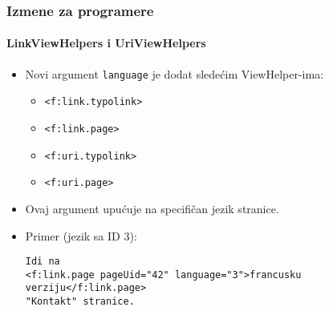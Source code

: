 
\begin{frame}[fragile]
	\frametitle{Izmene za programere}
	\framesubtitle{LinkViewHelpers i UriViewHelpers}

	\lstset{basicstyle=\tiny\ttfamily}

	\begin{itemize}
		\item Novi argument \texttt{language} je dodat sledećim ViewHelper-ima:
			\begin{itemize}
				\item \texttt{<f:link.typolink>}
				\item \texttt{<f:link.page>}
				\item \texttt{<f:uri.typolink>}
				\item \texttt{<f:uri.page>}
			\end{itemize}

		\item Ovaj argument upućuje na specifičan jezik stranice.
		\item Primer (jezik sa ID 3):
\begin{lstlisting}
Idi na
<f:link.page pageUid="42" language="3">francusku verziju</f:link.page>
"Kontakt" stranice.
\end{lstlisting}

	\end{itemize}

\end{frame}


